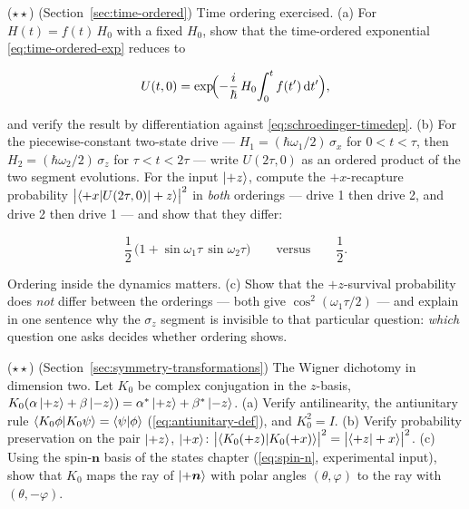 \begin{problemset}
\item ($\star\star$) (Section~\ref{sec:time-ordered}) Time ordering exercised. (a) For $H(t) = f(t)\,H_0$ with a fixed $H_0$, show that the time-ordered exponential \eqref{eq:time-ordered-exp} reduces to
\begin{linenomath}
    \begin{equation}
        U(t,0) = \exp\!\Bigl(-\frac{i}{\hbar}\,H_0\!\int_0^t f(t')\,\mathrm{d} t'\Bigr) ,
    \end{equation}
\end{linenomath}
and verify the result by differentiation against \eqref{eq:schroedinger-timedep}. (b) For the piecewise-constant two-state drive --- $H_1 = (\hbar\omega_1/2)\,\sigma_x$ for $0 < t < \tau$, then $H_2 = (\hbar\omega_2/2)\,\sigma_z$ for $\tau < t < 2\tau$ --- write $U(2\tau,0)$ as an ordered product of the two segment evolutions. For the input $\ket{+z}$, compute the $+x$-recapture probability $\bigl|\braket{+x|U(2\tau,0)|+z}\bigr|^2$ in \emph{both} orderings --- drive 1 then drive 2, and drive 2 then drive 1 --- and show that they differ:
\begin{linenomath}
    \begin{equation}
        \frac{1}{2}\,\bigl(1 + \sin\omega_1\tau\,\sin\omega_2\tau\bigr)
        \qquad\text{versus}\qquad
        \frac{1}{2} .
    \end{equation}
\end{linenomath}
Ordering inside the dynamics matters. (c) Show that the $+z$-survival probability does \emph{not} differ between the orderings --- both give $\cos^2(\omega_1\tau/2)$ --- and explain in one sentence why the $\sigma_z$ segment is invisible to that particular question: \emph{which} question one asks decides whether ordering shows.

\item ($\star\star$) (Section~\ref{sec:symmetry-transformations}) The Wigner dichotomy in dimension two. Let $K_0$ be complex conjugation in the $z$-basis, $K_0(\alpha\ket{+z} + \beta\ket{-z}) = \alpha^*\ket{+z} + \beta^*\ket{-z}$. (a) Verify antilinearity, the antiunitary rule $\braket{K_0\phi|K_0\psi} = \braket{\psi|\phi}$ (\eqref{eq:antiunitary-def}), and $K_0^2 = I$. (b) Verify probability preservation on the pair $\ket{+z}$, $\ket{+x}$: $\bigl|\braket{K_0(+z)|K_0(+x)}\bigr|^2 = \bigl|\braket{+z|+x}\bigr|^2$. (c) Using the spin-$\bm n$ basis of the states chapter (\eqref{eq:spin-n}, experimental input), show that $K_0$ maps the ray of $\ket{+\bm n}$ with polar angles $(\theta,\varphi)$ to the ray with $(\theta,-\varphi)$.


\end{problemset}

